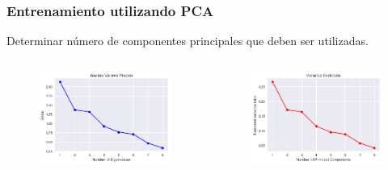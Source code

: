 \documentclass[handout]{beamer}
\begin{document}
\begin{frame}
\frametitle{Entrenamiento utilizando PCA}

Determinar número de componentes principales que deben ser utilizadas.

\begin{columns}[t] %


\begin{figure}
\includegraphics[width=\textwidth]{../figures/eigenvalues.png}
\end{figure}

\begin{figure}
\includegraphics[width=\textwidth]{../figures/varianza_ratio.png}
\end{figure}

\end{columns}

\end{frame}
\end{document}
